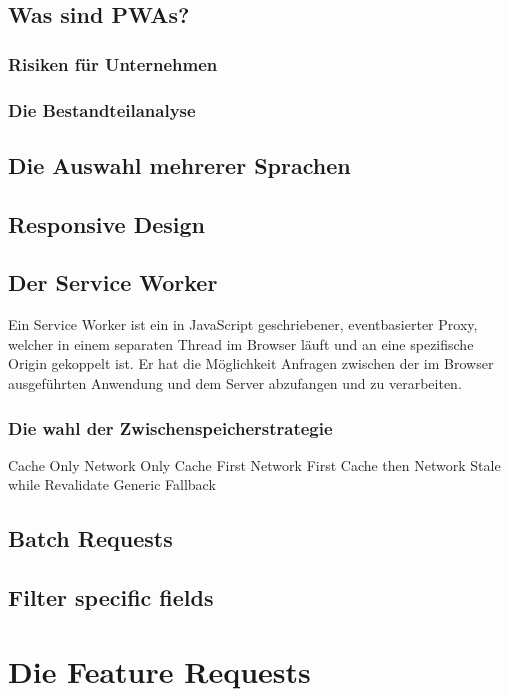 \section{Was sind PWAs?}

\subsection{Risiken für Unternehmen}

\subsection{Die Bestandteilanalyse}

\section{Die Auswahl mehrerer Sprachen}

\section{Responsive Design}


\section{Der Service Worker}
Ein Service Worker ist ein in JavaScript geschriebener,
eventbasierter Proxy, welcher in einem separaten Thread im Browser
läuft und an eine spezifische Origin gekoppelt ist. Er hat
die Möglichkeit Anfragen zwischen der im Browser ausgeführten
Anwendung und dem Server abzufangen und zu verarbeiten.

\subsection{Die wahl der Zwischenspeicherstrategie}
Cache Only
Network Only
Cache First
Network First
Cache then Network
Stale while Revalidate
Generic Fallback

\section{Batch Requests}

\section{Filter specific fields}

\chapter{Die Feature Requests}

